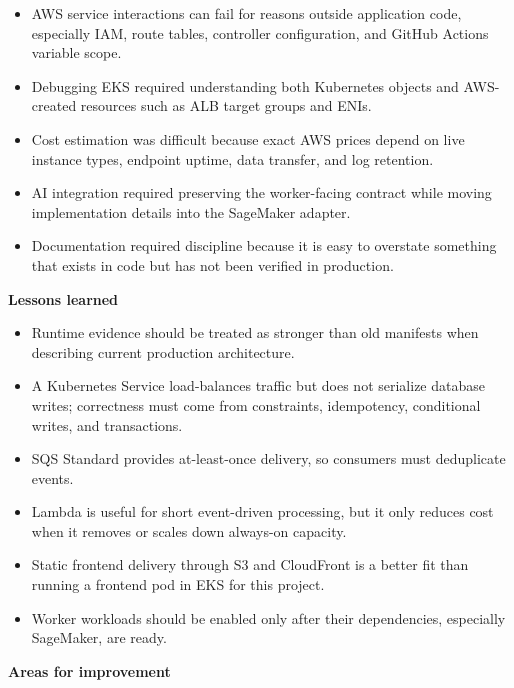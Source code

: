 \begin{itemize}
\tightlist
\item
  AWS service interactions can fail for reasons outside application
  code, especially IAM, route tables, controller configuration, and
  GitHub Actions variable scope.
\item
  Debugging EKS required understanding both Kubernetes objects and
  AWS-created resources such as ALB target groups and ENIs.
\item
  Cost estimation was difficult because exact AWS prices depend on live
  instance types, endpoint uptime, data transfer, and log retention.
\item
  AI integration required preserving the worker-facing contract while
  moving implementation details into the SageMaker adapter.
\item
  Documentation required discipline because it is easy to overstate
  something that exists in code but has not been verified in production.
\end{itemize}

\vspace{0.5em}\noindent\textbf{Lessons learned}\par

\begin{itemize}
\tightlist
\item
  Runtime evidence should be treated as stronger than old manifests when
  describing current production architecture.
\item
  A Kubernetes Service load-balances traffic but does not serialize
  database writes; correctness must come from constraints, idempotency,
  conditional writes, and transactions.
\item
  SQS Standard provides at-least-once delivery, so consumers must
  deduplicate events.
\item
  Lambda is useful for short event-driven processing, but it only
  reduces cost when it removes or scales down always-on capacity.
\item
  Static frontend delivery through S3 and CloudFront is a better fit
  than running a frontend pod in EKS for this project.
\item
  Worker workloads should be enabled only after their dependencies,
  especially SageMaker, are ready.
\end{itemize}

\vspace{0.5em}\noindent\textbf{Areas for improvement}\par

